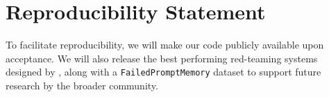 \section{Reproducibility Statement}
To facilitate reproducibility, we will make our code publicly available upon acceptance. We will also release the best performing red-teaming systems designed by \method, along with a \texttt{FailedPromptMemory} dataset to support future research by the broader community.